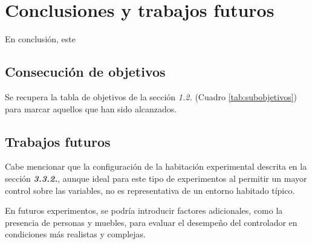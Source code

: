 \section{Conclusiones y trabajos futuros}

En conclusión, este

\subsection{Consecución de objetivos}

Se recupera la tabla de objetivos de la sección \textit{1.2.} (Cuadro \ref{tab:subobjetivos}) para marcar aquellos que han sido alcanzados.

\subsection{Trabajos futuros}

Cabe mencionar que la configuración de la habitación experimental descrita en la sección \textbf{\textit{3.3.2.}}, aunque ideal para este tipo de experimentos al permitir un mayor control sobre las variables, no es representativa de un entorno habitado típico. 

En futuros experimentos, se podría introducir factores adicionales, como la presencia de personas y muebles, para evaluar el desempeño del controlador en condiciones más realistas y complejas.

